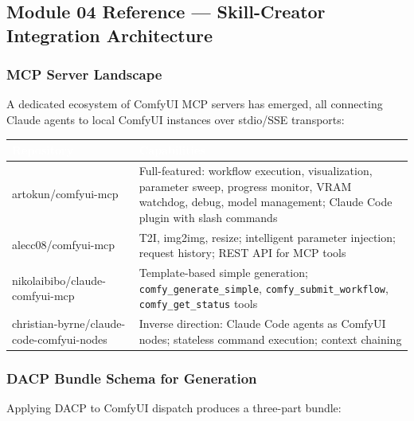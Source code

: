 \documentclass[11pt,letterpaper]{article}
\newcommand{\tableheader}[1]{\textbf{\sffamily\textcolor{white}{#1}}}
\begin{document}
\subsection{Module 04 Reference --- Skill-Creator Integration Architecture}

\subsubsection{MCP Server Landscape}

A dedicated ecosystem of ComfyUI MCP servers has emerged, all connecting Claude
agents to local ComfyUI instances over stdio/SSE transports:

\begin{center}
\begin{tabularx}{\textwidth}{L{4cm}X}
\toprule
{}
\tableheader{Repository} & \tableheader{Capabilities} \\
\midrule
artokun/comfyui-mcp & Full-featured: workflow execution, visualization, parameter sweep, progress monitor, VRAM watchdog, debug, model management; Claude Code plugin with slash commands \\
alecc08/comfyui-mcp & T2I, img2img, resize; intelligent parameter injection; request history; REST API for MCP tools \\
nikolaibibo/claude-comfyui-mcp & Template-based simple generation; \texttt{comfy\_generate\_simple}, \texttt{comfy\_submit\_workflow}, \texttt{comfy\_get\_status} tools \\
christian-byrne/claude-code-comfyui-nodes & Inverse direction: Claude Code agents as ComfyUI nodes; stateless command execution; context chaining \\
\bottomrule
\end{tabularx}
\end{center}

\subsubsection{DACP Bundle Schema for Generation}

Applying DACP to ComfyUI dispatch produces a three-part bundle:

\end{document}
